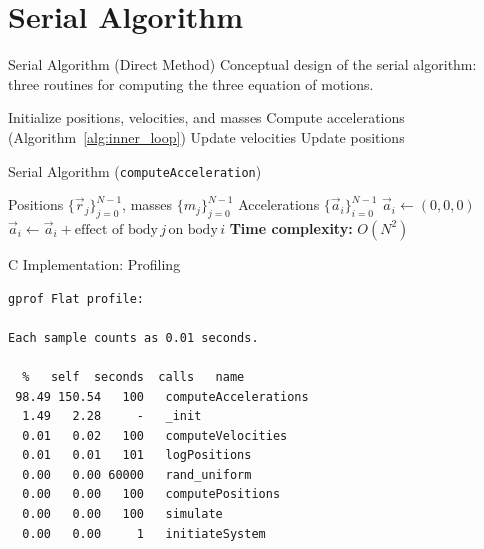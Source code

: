 \documentclass{beamer}
\begin{document}
\section{Serial Algorithm}
\begin{frame}{Serial Algorithm (Direct Method)}
Conceptual design of the serial algorithm:
three routines for computing the three equation of motions.
\begin{algorithm}[H]
\caption{Serial N-body algorithm (direct method)}
\label{alg:serial}
\begin{algorithmic}[1]
\State Initialize positions, velocities, and masses
    \State Compute accelerations (Algorithm~\ref{alg:inner_loop})
    \State Update velocities
    \State Update positions
\EndFor
\end{algorithmic}
\end{algorithm}
\end{frame}

\begin{frame}{Serial Algorithm (\texttt{computeAcceleration})}
\begin{algorithm}[H]
\caption{Inner loop: compute accelerations (direct method)}
\label{alg:inner_loop}
\begin{algorithmic}[1]
\Require Positions $\{\vec r_j\}_{j=0}^{N-1}$, masses $\{m_j\}_{j=0}^{N-1}$
\Ensure Accelerations $\{\vec a_i\}_{i=0}^{N-1}$
  \State $\vec a_i \gets (0,0,0)$
      \State $\vec a_i \gets \vec a_i + \text{effect of body}\, j \, \text{on body}\, i$
    \EndIf
  \EndFor
\EndFor
\Statex \textbf{Time complexity:} $O(N^2)$
\end{algorithmic}
\end{algorithm}
\end{frame}





\begin{frame}[fragile]{C Implementation: Profiling}
\centering

\begin{verbatim}
gprof Flat profile:

Each sample counts as 0.01 seconds.

  %   self  seconds  calls   name
 98.49 150.54   100   computeAccelerations
  1.49   2.28     -   _init
  0.01   0.02   100   computeVelocities
  0.01   0.01   101   logPositions
  0.00   0.00 60000   rand_uniform
  0.00   0.00   100   computePositions
  0.00   0.00   100   simulate
  0.00   0.00     1   initiateSystem
\end{verbatim}

\end{frame}
\end{document}
